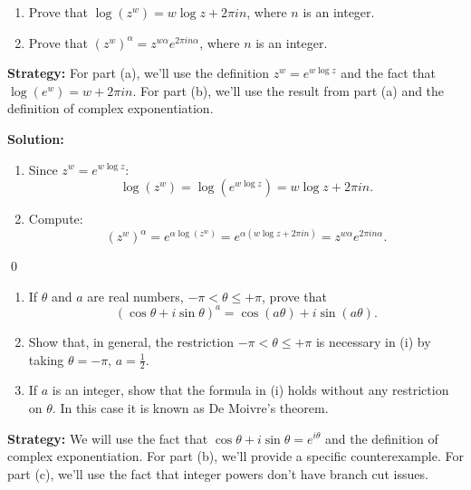 \begin{problembox}
\begin{enumerate}[label=\alph*)]
\item Prove that \( \log(z^w) = w \log z + 2\pi i n \), where \( n \) is an integer.
\item Prove that \( (z^w)^\alpha = z^{w\alpha} e^{2\pi i n \alpha} \), where \( n \) is an integer.
\end{enumerate}
\end{problembox}

\noindent\textbf{Strategy:} For part (a), we'll use the definition $z^w = e^{w \log z}$ and the fact that $\log(e^w) = w + 2\pi i n$. For part (b), we'll use the result from part (a) and the definition of complex exponentiation.

\bigskip\noindent\textbf{Solution:}
\begin{enumerate}[label=\alph*)]
\item Since \( z^w = e^{w \log z} \):
\[
\log(z^w) = \log(e^{w \log z}) = w \log z + 2\pi i n.
\]
\item Compute:
\[
(z^w)^\alpha = e^{\alpha \log(z^w)} = e^{\alpha(w \log z + 2\pi i n)} = z^{w\alpha} e^{2\pi i n \alpha}.
\]
\end{enumerate}\qed


\begin{problembox}
\begin{enumerate}[label=\roman*)]
\item If \( \theta \) and \( a \) are real numbers, \( -\pi < \theta \leq +\pi \), prove that
\[
(\cos \theta + i \sin \theta)^a = \cos(a\theta) + i \sin(a\theta).
\]
\item Show that, in general, the restriction \( -\pi < \theta \leq +\pi \) is necessary in (i) by taking \( \theta = -\pi \), \( a = \tfrac{1}{2} \).
\item If \( a \) is an integer, show that the formula in (i) holds without any restriction on \( \theta \). In this case it is known as De Moivre's theorem.
\end{enumerate}
\end{problembox}

\noindent\textbf{Strategy:} We will use the fact that $\cos \theta + i \sin \theta = e^{i\theta}$ and the definition of complex exponentiation. For part (b), we'll provide a specific counterexample. For part (c), we'll use the fact that integer powers don't have branch cut issues.


